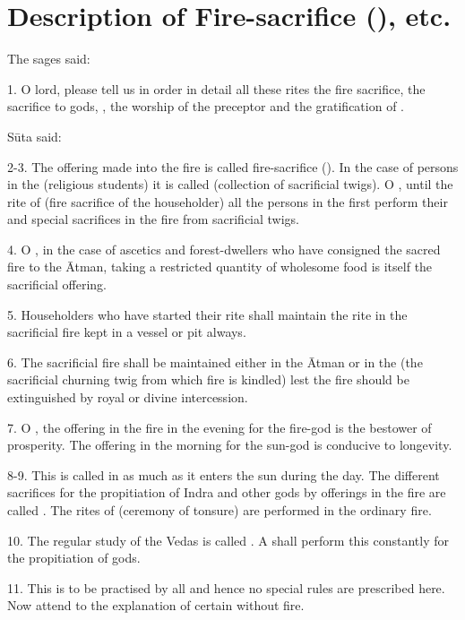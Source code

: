 \chapter{Description of Fire-sacrifice (), etc.}

The sages said:

1. O lord, please tell us in order in detail all these rites \viz the fire
sacrifice, the sacrifice to gods, , the worship of the preceptor
and the gratification of .

Sūta said:

2-3. The offering made into the fire is called fire-sacrifice ().
In the case of persons in the  (\ie religious students)
it is called  (collection of sacrificial twigs). O ,
until the rite of  (fire sacrifice of the householder) all
the persons in the first  perform their  and special
sacrifices in the fire from sacrificial twigs.

4. O , in the case of ascetics and forest-dwellers who have
consigned the sacred fire to the Ātman, taking a restricted quantity of
wholesome food is itself the sacrificial offering.

5. Householders who have started their  rite shall maintain
the rite in the sacrificial fire kept in a vessel or pit always.

6. The sacrificial fire shall be maintained either in the Ātman or in
the  (the sacrificial churning twig from which fire is kindled) lest
the fire should be extinguished by royal or divine intercession.

7. O , the offering in the fire in the evening for the fire-god is
the bestower of prosperity. The offering in the morning for the sun-god is
conducive to longevity.

8-9. This is called  in as much as it enters the sun during
the day. The different sacrifices  \etc for the propitiation of
Indra and other gods by offerings in the fire are called .
The rites of  (ceremony of tonsure) \etc are performed in the ordinary
fire.

10. The regular study of the Vedas is called . A 
shall perform this constantly for the propitiation of gods.

11. This is to be practised by all and hence no special rules are prescribed
here. Now attend to the explanation of certain  without fire.

